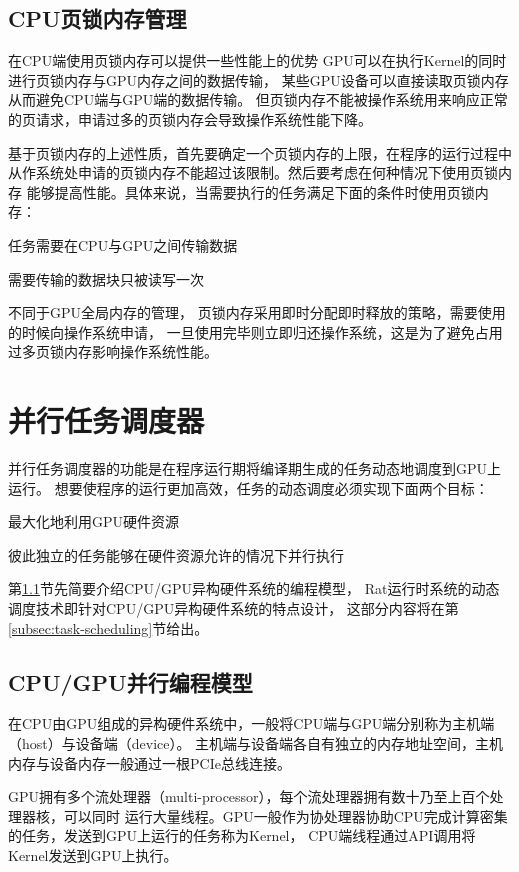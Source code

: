 \subsection{CPU页锁内存管理}
在CPU端使用页锁内存可以提供一些性能上的优势
GPU可以在执行Kernel的同时进行页锁内存与GPU内存之间的数据传输，
某些GPU设备可以直接读取页锁内存从而避免CPU端与GPU端的数据传输。
但页锁内存不能被操作系统用来响应正常的页请求，申请过多的页锁内存会导致操作系统性能下降。

基于页锁内存的上述性质，首先要确定一个页锁内存的上限，在程序的运行过程中
从作系统处申请的页锁内存不能超过该限制。然后要考虑在何种情况下使用页锁内存
能够提高性能。具体来说，当需要执行的任务满足下面的条件时使用页锁内存：
\begin{compactitem}
  \item 任务需要在CPU与GPU之间传输数据
  \item 需要传输的数据块只被读写一次
\end{compactitem}

不同于GPU全局内存的管理，
页锁内存采用即时分配即时释放的策略，需要使用的时候向操作系统申请，
一旦使用完毕则立即归还操作系统，这是为了避免占用过多页锁内存影响操作系统性能。

\section{并行任务调度器}\label{sec:task-scheduler}
并行任务调度器的功能是在程序运行期将编译期生成的任务动态地调度到GPU上运行。
想要使程序的运行更加高效，任务的动态调度必须实现下面两个目标：
\begin{compactitem}
  \item 最大化地利用GPU硬件资源
  \item 彼此独立的任务能够在硬件资源允许的情况下并行执行
\end{compactitem}

第\ref{cpu-gpu-model}节先简要介绍CPU/GPU异构硬件系统的编程模型，
Rat运行时系统的动态调度技术即针对CPU/GPU异构硬件系统的特点设计，
这部分内容将在第\ref{subsec:task-scheduling}节给出。

\subsection{CPU/GPU并行编程模型}\label{cpu-gpu-model}
在CPU由GPU组成的异构硬件系统中，一般将CPU端与GPU端分别称为主机端（host）与设备端（device）。
主机端与设备端各自有独立的内存地址空间，主机内存与设备内存一般通过一根PCIe总线连接。

GPU拥有多个流处理器（multi-processor），每个流处理器拥有数十乃至上百个处理器核，可以同时
运行大量线程。GPU一般作为协处理器协助CPU完成计算密集的任务，发送到GPU上运行的任务称为Kernel，
CPU端线程通过API调用将Kernel发送到GPU上执行。

